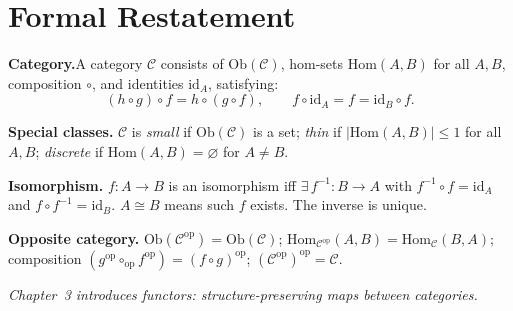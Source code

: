\section*{Formal Restatement}

\begin{formalrestatement}
\textbf{Category.}\quad A category $\mathcal{C}$ consists of
$\mathrm{Ob}(\mathcal{C})$, hom-sets $\mathrm{Hom}(A,B)$ for all $A,B$,
composition $\circ$, and identities $\mathrm{id}_A$, satisfying:
\[
  (h \circ g) \circ f = h \circ (g \circ f),
  \qquad
  f \circ \mathrm{id}_A = f = \mathrm{id}_B \circ f.
\]

\medskip
\textbf{Special classes.}\quad
$\mathcal{C}$ is \emph{small} if $\mathrm{Ob}(\mathcal{C})$ is a set;
\emph{thin} if $|\mathrm{Hom}(A,B)| \leq 1$ for all $A,B$;
\emph{discrete} if $\mathrm{Hom}(A,B) = \varnothing$ for $A \neq B$.

\medskip
\textbf{Isomorphism.}\quad
$f : A \to B$ is an isomorphism iff $\exists\, f^{-1} : B \to A$ with
$f^{-1} \circ f = \mathrm{id}_A$ and $f \circ f^{-1} = \mathrm{id}_B$.
$A \cong B$ means such $f$ exists. The inverse is unique.

\medskip
\textbf{Opposite category.}\quad
$\mathrm{Ob}(\mathcal{C}^{\mathrm{op}}) = \mathrm{Ob}(\mathcal{C})$;
$\mathrm{Hom}_{\mathcal{C}^{\mathrm{op}}}(A,B) = \mathrm{Hom}_\mathcal{C}(B,A)$;
composition $(g^{\mathrm{op}} \circ_{\mathrm{op}} f^{\mathrm{op}}) =
(f \circ g)^{\mathrm{op}}$;
$(\mathcal{C}^{\mathrm{op}})^{\mathrm{op}} = \mathcal{C}$.

\medskip
\noindent\textit{Chapter~3 introduces functors: structure-preserving maps
between categories.}
\end{formalrestatement}
